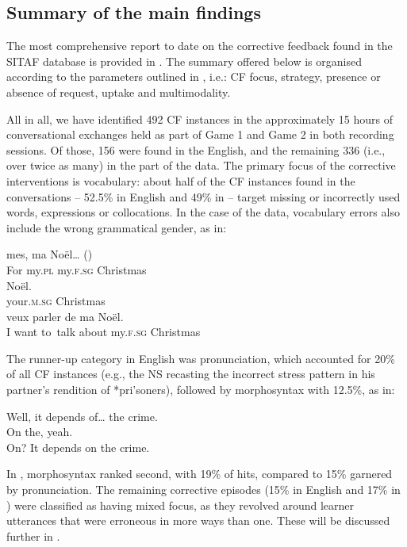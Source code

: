 \documentclass[output=paper,colorlinks,citecolor=brown,modfonts,nonflat]{../langscibook}
\begin{document}
\subsection{Summary of the main findings}\label{sec:scheuer:4.2}

The most comprehensive report to date on the corrective feedback found in the SITAF database is provided in \citet{ScheuerHorgues2020}. The summary offered below is organised according to the parameters outlined in , i.e.: CF focus, strategy, presence or absence of request, uptake and multimodality.

All in all, we have identified 492 CF instances in the approximately 15 hours of conversational exchanges held as part of Game 1 and Game 2 in both recording sessions. Of those, 156 were found in the English, and the remaining 336 (i.e., over twice as many) in the  part of the data. The primary focus of the corrective interventions is vocabulary: about half of the CF instances found in the conversations – 52.5\% in English and 49\% in  – target missing or incorrectly used words, expressions or collocations. In the case of the  data, vocabulary errors also include the wrong grammatical gender, as in:

\ea\label{ex:scheuer:6}
{\NNS}
 {mes,}    {ma}    {Noël…}   ()\\
      For my.\textsc{pl}    my.\textsc{f.sg}  Christmas\\

{\NS}
    {Noël.}\\
your{}.\textsc{m.sg}    Christmas\\

{\NNS}
 {veux} {parler} {de}  {ma}     {Noël.}\\
I want to~talk about    my.\textsc{f.sg}  Christmas\\
\z

The runner-up category in English was pronunciation, which accounted for 20\% of all CF instances (e.g., the NS recasting the incorrect stress pattern in his partner’s rendition of *pri'soners), followed by morphosyntax with 12.5\%, as in:

\ea\label{ex:scheuer:7}
{\NNS} {Well,} {it} {depends} {of…} {the} {crime.}\\
{\NS} {On} {the,} {yeah.}\\
{\NNS} {On?} {It} {depends} {on} {the} {crime.}
\z

In , morphosyntax ranked second, with 19\% of hits, compared to 15\% garnered by pronunciation. The remaining corrective episodes (15\% in English and 17\% in ) were classified as having mixed focus, as they revolved around learner utterances that were erroneous in more ways than one. These will be discussed further in . 
\end{document}
